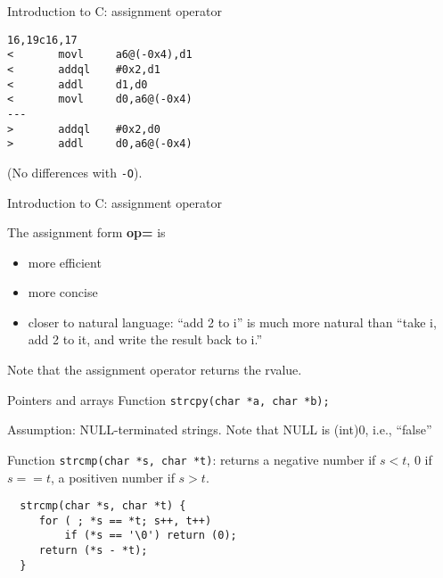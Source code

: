 \begin{frame}[fragile]{Introduction to C: assignment operator}
\begin{verbatim}
16,19c16,17
<       movl     a6@(-0x4),d1
<       addql    #0x2,d1
<       addl     d1,d0
<       movl     d0,a6@(-0x4)
---
>       addql    #0x2,d0
>       addl     d0,a6@(-0x4)
\end{verbatim}


\vspace{20pt}

(No differences with \verb"-O").

\end{frame}
\begin{frame}[fragile]{Introduction to C: assignment operator}

The assignment form {\bf op=}  is


\vspace{20pt}

\begin{itemize}
\item more efficient
\item more concise
\item closer to natural language: ``add 2 to i'' is much more
natural than ``take i, add 2 to it, and write the result back to i.''
\end{itemize}


\vspace{20pt}

Note that the assignment operator returns the rvalue.

\end{frame}
\begin{frame}[fragile]{Pointers and arrays}
Function {\tt strcpy(char *a, char *b);}


\vspace{20pt}

Assumption: NULL-terminated strings. Note that NULL is (int)0,
i.e., ``false''


\vspace{20pt}

Function {\tt strcmp(char *s, char *t)}: returns a negative number if $s<t$,
0 if $s==t$, a positiven number if $s>t$.


\vspace{20pt}

\begin{tt}
\begin{verbatim}
  strcmp(char *s, char *t) {
     for ( ; *s == *t; s++, t++)
         if (*s == '\0') return (0);
     return (*s - *t);
  }
\end{verbatim}
\end{tt}

\end{frame}
